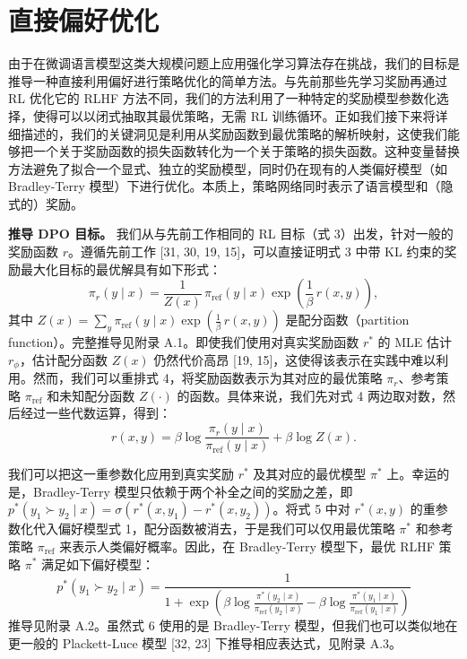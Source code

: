 \documentclass[11pt,UTF8,fontset=fandol]{ctexart}
\newcommand{\sref}{\mathrm{ref}}
\begin{document}
\section{直接偏好优化}

由于在微调语言模型这类大规模问题上应用强化学习算法存在挑战，我们的目标是推导一种直接利用偏好进行策略优化的简单方法。与先前那些先学习奖励再通过 RL 优化它的 RLHF 方法不同，我们的方法利用了一种特定的奖励模型参数化选择，使得可以以闭式抽取其最优策略，无需 RL 训练循环。正如我们接下来将详细描述的，我们的关键洞见是利用从奖励函数到最优策略的解析映射，这使我们能够把一个关于奖励函数的损失函数转化为一个关于策略的损失函数。这种变量替换方法避免了拟合一个显式、独立的奖励模型，同时仍在现有的人类偏好模型（如 Bradley-Terry 模型）下进行优化。本质上，策略网络同时表示了语言模型和（隐式的）奖励。

\textbf{推导 DPO 目标。} 我们从与先前工作相同的 RL 目标（式 3）出发，针对一般的奖励函数 $r$。遵循先前工作 [31, 30, 19, 15]，可以直接证明式 3 中带 KL 约束的奖励最大化目标的最优解具有如下形式：
\begin{equation}
\pi_r(y \mid x) = \frac{1}{Z(x)}\, \pi_\sref(y \mid x) \exp\left(\frac{1}{\beta}\, r(x, y)\right), \tag{4}
\end{equation}
其中 $Z(x) = \sum_y \pi_\sref(y \mid x) \exp\left(\frac{1}{\beta}\, r(x, y)\right)$ 是配分函数（partition function）。完整推导见附录 A.1。即使我们使用对真实奖励函数 $r^*$ 的 MLE 估计 $r_\phi$，估计配分函数 $Z(x)$ 仍然代价高昂 [19, 15]，这使得该表示在实践中难以利用。然而，我们可以重排式 4，将奖励函数表示为其对应的最优策略 $\pi_r$、参考策略 $\pi_\sref$ 和未知配分函数 $Z(\cdot)$ 的函数。具体来说，我们先对式 4 两边取对数，然后经过一些代数运算，得到：
\begin{equation}
r(x, y) = \beta \log \frac{\pi_r(y \mid x)}{\pi_\sref(y \mid x)} + \beta \log Z(x). \tag{5}
\end{equation}

我们可以把这一重参数化应用到真实奖励 $r^*$ 及其对应的最优模型 $\pi^*$ 上。幸运的是，Bradley-Terry 模型只依赖于两个补全之间的奖励之差，即 $p^*(y_1 \succ y_2 \mid x) = \sigma(r^*(x, y_1) - r^*(x, y_2))$。将式 5 中对 $r^*(x, y)$ 的重参数化代入偏好模型式 1，配分函数被消去，于是我们可以仅用最优策略 $\pi^*$ 和参考策略 $\pi_\sref$ 来表示人类偏好概率。因此，在 Bradley-Terry 模型下，最优 RLHF 策略 $\pi^*$ 满足如下偏好模型：
\begin{equation}
p^*(y_1 \succ y_2 \mid x) = \frac{1}{1 + \exp\left(\beta \log \frac{\pi^*(y_2 \mid x)}{\pi_\sref(y_2 \mid x)} - \beta \log \frac{\pi^*(y_1 \mid x)}{\pi_\sref(y_1 \mid x)}\right)} \tag{6}
\end{equation}
推导见附录 A.2。虽然式 6 使用的是 Bradley-Terry 模型，但我们也可以类似地在更一般的 Plackett-Luce 模型 [32, 23] 下推导相应表达式，见附录 A.3。
\end{document}
